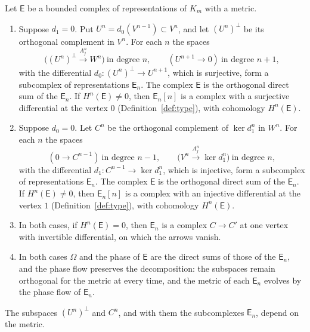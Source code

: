 \begin{theorem}[Decomposition]\label{thm:decomposition}
Let $\mathsf E$ be a bounded complex of representations of $K_m$ with a
metric.
\begin{enumerate}
\item[(a)] Suppose $d_1=0$. Put $U^n=d_0(V^{n-1})\subset V^n$, and let
 $(U^n)^\perp$ be its orthogonal complement in $V^n$. For each $n$ the spaces
 \[
 \bigl((U^n)^\perp\xrightarrow{A_j^n}W^n\bigr)\ \text{in degree }n,\qquad
 (U^{n+1}\to0)\ \text{in degree }n+1,
 \]
 with the differential $d_0:(U^n)^\perp\to U^{n+1}$, which is surjective,
 form a subcomplex of representations $\mathsf E_n$. The complex $\mathsf E$
 is the orthogonal direct sum of the $\mathsf E_n$. If $H^n(\mathsf E)\neq0$,
 then $\mathsf E_n[n]$ is a complex with a surjective differential at the
 vertex $0$ (Definition~\ref{def:type}), with cohomology $H^n(\mathsf E)$.
\item[(b)] Suppose $d_0=0$. Let $C^n$ be the orthogonal complement of
 $\ker d_1^n$ in $W^n$. For each $n$ the spaces
 \[
 (0\to C^{n-1})\ \text{in degree }n-1,\qquad
 \bigl(V^n\xrightarrow{A_j^n}\ker d_1^n\bigr)\ \text{in degree }n,
 \]
 with the differential $d_1:C^{n-1}\to\ker d_1^n$, which is injective, form
 a subcomplex of representations $\mathsf E_n$. The complex $\mathsf E$ is the
 orthogonal direct sum of the $\mathsf E_n$. If $H^n(\mathsf E)\neq0$, then
 $\mathsf E_n[n]$ is a complex with an injective differential at the vertex
 $1$ (Definition~\ref{def:type}), with cohomology $H^n(\mathsf E)$.
\item[(c)] In both cases, if $H^n(\mathsf E)=0$, then $\mathsf E_n$ is a
 complex $C\to C'$ at one vertex with invertible differential, on which the
 arrows vanish.
\item[(d)] In both cases $\Omega$ and the phase of $\mathsf E$ are the direct
 sums of those of the $\mathsf E_n$, and the phase flow preserves the
 decomposition: the subspaces remain orthogonal for the metric at every time,
 and the metric of each $\mathsf E_n$ evolves by the phase flow of
 $\mathsf E_n$.
\end{enumerate}
The subspaces $(U^n)^\perp$ and $C^n$, and with them the subcomplexes
$\mathsf E_n$, depend on the metric.
\end{theorem}

